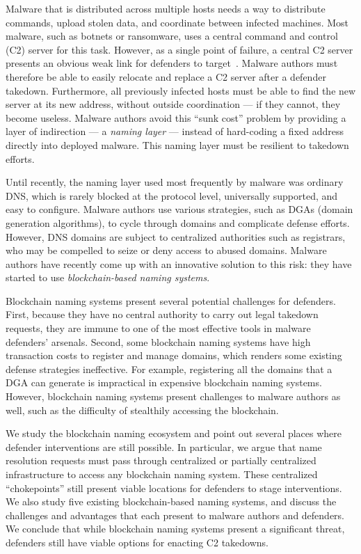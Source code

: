 Malware that is distributed across multiple hosts 
needs a way to distribute 
commands, upload stolen 
data, and coordinate between infected machines. Most malware, 
such as botnets or 
ransomware, uses a 
central command and control (C2) server for this task. However, as a single 
point of failure, a 
central C2 server presents an obvious weak link for defenders to 
target~\cite{kesari_deterring_2017}. 
Malware authors must therefore be able to easily relocate and replace a C2 
server after a defender 
takedown. Furthermore, all previously infected hosts must be 
able to find the new server at 
its new address, 
without outside coordination --- if they cannot, they become useless. Malware 
authors avoid 
this ``sunk cost'' problem by providing a layer of 
indirection --- a \emph{naming 
layer} --- instead of 
hard-coding a fixed address directly into deployed malware. 
This 
naming layer must be 
resilient to takedown efforts.

Until recently, the naming layer used most frequently by malware was ordinary 
DNS, which is rarely 
blocked at the protocol level, universally supported, and easy to configure. 
Malware authors use 
various strategies, such as DGAs (domain generation 
algorithms), 
to cycle through domains and complicate defense efforts. 
However, 
DNS domains are subject 
to centralized authorities such as registrars, who may be 
compelled to 
seize or deny access to abused 
domains. Malware 
authors have recently come up with an innovative solution to this risk: they 
have started to use 
\emph{blockchain-based naming systems}. 

Blockchain naming systems present several potential 
challenges for 
defenders. First, because they 
have no central authority to carry out legal takedown 
requests, they are immune to one of the most effective tools 
in malware defenders' arsenals. Second, some blockchain 
naming systems 
have high transaction costs to register and manage domains, 
which renders some existing defense 
strategies ineffective. For example, registering all the 
domains 
that a DGA can generate 
is impractical in expensive blockchain naming systems. 
However, blockchain naming systems 
present challenges to malware authors as well, such as the 
difficulty of stealthily accessing the blockchain.

We study the blockchain naming ecosystem and point out 
several places where defender interventions are still 
possible. In particular, we argue that name resolution 
requests must 
pass through centralized or partially centralized 
infrastructure to access any blockchain naming system. These 
centralized ``chokepoints'' still present viable locations 
for defenders to stage interventions. We also study five 
existing 
blockchain-based naming systems, and discuss the challenges 
and advantages that each present to malware authors and 
defenders. 
We conclude that while blockchain 
naming systems present a significant threat, defenders still 
have viable options for enacting C2 takedowns.

